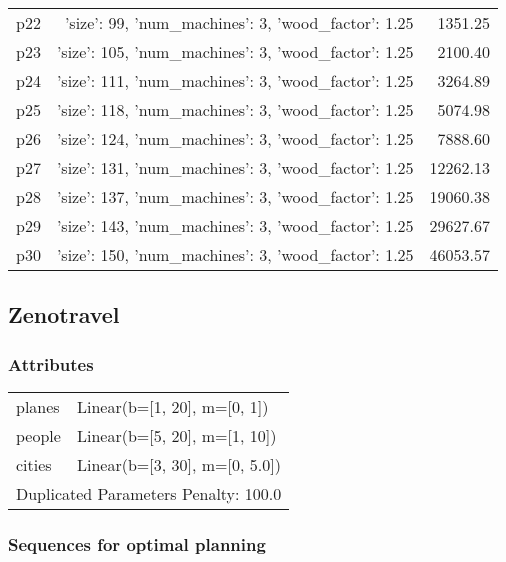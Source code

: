 \documentclass{article}
\begin{document}
\begin{center}
\begin{tabular}{@{}l|r|r@{}}
  p22&{'size': 99, 'num\_machines': 3, 'wood\_factor': 1.25}&1351.25\\
  p23&{'size': 105, 'num\_machines': 3, 'wood\_factor': 1.25}&2100.40\\
  p24&{'size': 111, 'num\_machines': 3, 'wood\_factor': 1.25}&3264.89\\
  p25&{'size': 118, 'num\_machines': 3, 'wood\_factor': 1.25}&5074.98\\
  p26&{'size': 124, 'num\_machines': 3, 'wood\_factor': 1.25}&7888.60\\
  p27&{'size': 131, 'num\_machines': 3, 'wood\_factor': 1.25}&12262.13\\
  p28&{'size': 137, 'num\_machines': 3, 'wood\_factor': 1.25}&19060.38\\
  p29&{'size': 143, 'num\_machines': 3, 'wood\_factor': 1.25}&29627.67\\
  p30&{'size': 150, 'num\_machines': 3, 'wood\_factor': 1.25}&46053.57
                            \end{tabular}
                            \end{center}
                    
                            \newpage \subsection{Zenotravel}
                    \subsubsection*{Attributes}
                    \begin{tabular}{@{}p{}p{}@{}}
                    \toprule
                    planes & Linear(b=[1, 20], m=[0, 1])\\
people & Linear(b=[5, 20], m=[1, 10])\\
cities & Linear(b=[3, 30], m=[0, 5.0]) \\
                    \bottomrule
                    \multicolumn{2}{l}{Duplicated Parameters Penalty: 100.0}
                    \end{tabular}
                
                            \subsubsection*{Sequences for optimal planning}
\end{document}
